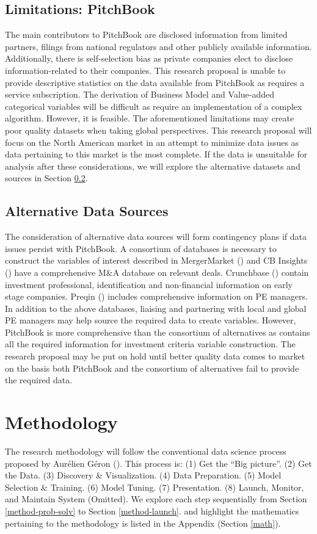 \documentclass[12pt]{article}
\begin{document}
\subsection{Limitations: PitchBook}
The main contributors to PitchBook are disclosed information from limited partners, filings from national regulators and other publicly available information.
Additionally, there is self-selection bias as private companies elect to disclose information-related to their companies.
This research proposal is unable to provide descriptive statistics on the data available from PitchBook as requires a service subscription.
The derivation of Business Model and Value-added categorical variables will be difficult as require an implementation of a complex algorithm.
However, it is feasible.
The aforementioned limitations may create poor quality datasets when taking global perspectives. 
This research proposal will focus on the North American market in an attempt to minimize data issues as data pertaining to this market is the most complete.
If the data is unsuitable for analysis after these considerations, we will explore the alternative datasets and sources in Section \ref{ADS}.
\subsection{Alternative Data Sources}\label{ADS}
The consideration of alternative data sources will form contingency plans if data issues persist with PitchBook.
A consortium of databases is necessary to construct the variables of interest described in 
MergerMarket (\citeyear{MM}) and CB Insights (\citeyear{CBI}) have a comprehensive M\&A database on relevant deals.
Crunchbase (\citeyear{CB}) contain investment professional, identification and non-financial information on early stage companies.
Preqin (\citeyear{PQ}) includes comprehensive information on PE managers.
In addition to the above databases, liaising and partnering with local and global PE managers may help source the required data to create variables.
However, PitchBook is more comprehensive than the consortium of alternatives as contains all the  required information for investment criteria variable construction.
The research proposal may be put on hold until better quality data comes to market on the basis both PitchBook and the consortium of alternatives fail to provide the required data.
\section{Methodology}\label{methods}
The research methodology will follow the conventional data science process proposed by Aur{\'e}lien G{\'e}ron (\citeyear{aurelien2017hands}). 
This process is: 
(1) Get the “Big picture”. 
(2) Get the Data. 
(3) Discovery \& Visualization. 
(4) Data Preparation.
(5) Model Selection \& Training.
(6) Model Tuning.
(7) Presentation.
(8) Launch, Monitor, and Maintain System (Omitted).
We explore each step sequentially from Section \ref{method-prob-solv} to Section \ref{method-launch}.
and highlight the mathematics pertaining to the methodology is listed in the Appendix (Section \ref{math}).
\end{document}
